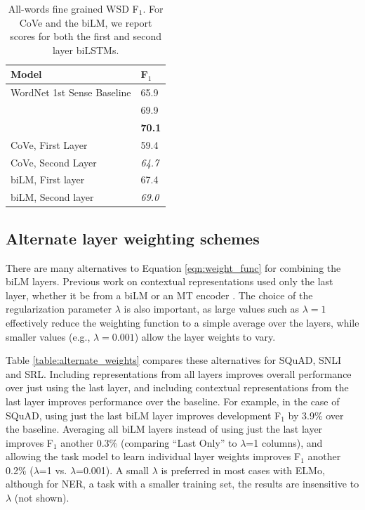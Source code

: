 \documentclass[11pt,a4paper]{article}
\newcommand{\ELMO}{ELMo}
\begin{document}
\begin{table}
\centering
\begin{tabular}{l|l}
 \textbf{Model} & \textbf{F}$_1$ \\ \hline \hline
WordNet 1st Sense  Baseline & 65.9 \\
\citet{Raganato2017NeuralSL} & 69.9 \\
\citet{Iacobacci2016EmbeddingsFW} & \textbf{70.1} \\ \hline
CoVe, First Layer & 59.4 \\
CoVe, Second Layer  & \textit{64.7} \\\hline
biLM, First layer & 67.4 \\
biLM, Second layer & \textit{69.0}
\end{tabular}
\caption{All-words fine grained WSD F$_1$.
For CoVe and the biLM, we report scores for both the first and second layer biLSTMs.}
\label{table:wsd}
\end{table}

\subsection{Alternate layer weighting schemes}
\label{sec:alternate_weighting}
There are many alternatives to Equation \ref{eqn:weight_func} for combining the biLM layers.
Previous work on contextual representations used only the last layer, whether it be from a biLM \citep{Peters2017SemisupervisedST} or an MT encoder \citep[CoVe;][]{McCann2017LearnedIT}.
The choice of the regularization parameter $\lambda$ is also important, as large values such as $\lambda=1$ effectively reduce the weighting function to a simple average over the layers, while smaller values (e.g., $\lambda=0.001$) allow the layer weights to vary.

Table \ref{table:alternate_weights} compares these alternatives for SQuAD, SNLI and SRL.
Including representations from all layers improves overall performance over just using the last layer, and including contextual representations from the last layer improves performance over the baseline.
For example, in the case of SQuAD, using just the last biLM layer improves development F$_1$ by 3.9\% over the baseline.  Averaging all biLM layers instead of using just the last layer improves F$_1$ another 0.3\% (comparing ``Last Only'' to $\lambda$=1 columns), and allowing the task model to learn individual layer weights improves F$_1$ another 0.2\% ($\lambda$=1 vs. $\lambda$=0.001).
A small $\lambda$ is preferred in most cases with \ELMO, although for NER, a task with a smaller training set, the results are insensitive to $\lambda$ (not shown).
\end{document}
